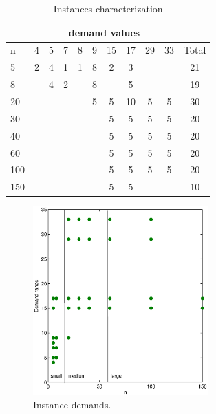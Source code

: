 \begin{table}[!h]
\centering
\begin{tabular}{| l | c c c c c c c c c | c |}
\hline
 & \multicolumn{9}{c|}{demand values} & \\ 
\hline
n & 4 & 5 & 7 & 8 & 9 & 15 & 17 & 29 & 33 & Total \\
\hline
5 & 2 & 4 & 1 & 1 & 8 & 2 & 3 &  &  & 21 \\ 
8 &  & 4 & 2 &  & 8 &  & 5 &  &  & 19 \\ 
20 &  &  &  &  & 5 & 5 & 10 & 5 & 5 & 30 \\ 
30 &  &  &  &  &  & 5 & 5 & 5 & 5 & 20 \\ 
40 &  &  &  &  &  & 5 & 5 & 5 & 5 & 20 \\ 
60 &  &  &  &  &  & 5 & 5 & 5 & 5 & 20 \\ 
100 &  &  &  &  &  & 5 & 5 & 5 & 5 & 20 \\ 
150 &  &  &  &  &  & 5 & 5 &  &  & 10 \\ 
\hline
\end{tabular}
\caption{Instances characterization}\label{tb:instances_characterization}
\end{table}

\begin{figure}[!htbp]
  \begin{center}
   \includegraphics[width=0.6\textwidth]{Images/Chapter5/instances.eps}
  \end{center}
    \caption{Instance demands.}\label{fig:instances}
\end{figure}


